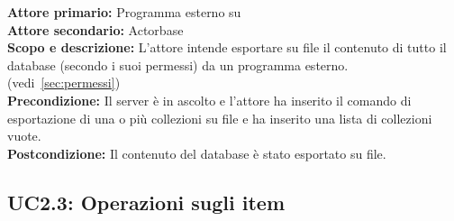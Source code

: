 \documentclass{scalatekids-article}
\begin{document}
\textbf{Attore primario:} Programma esterno su \\
\textbf{Attore secondario:} Actorbase\\
\textbf{Scopo e descrizione:} L'attore intende esportare su file il contenuto di tutto il database (secondo i suoi permessi) da un programma  esterno. (vedi~\ref{sec:permessi})\\
\textbf{Precondizione:} Il server è in ascolto e l'attore ha inserito il comando di esportazione di una o più collezioni su file e ha inserito una lista di collezioni vuote.\\
\textbf{Postcondizione:} Il contenuto del database è stato esportato su file.

\subsection{UC2.3: Operazioni sugli item}
\end{document}

